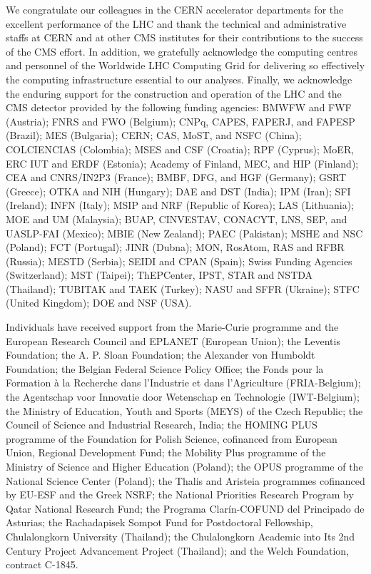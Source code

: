 \begin{acknowledgments}
We congratulate our colleagues in the CERN accelerator departments for the excellent performance of the LHC and thank the technical and administrative staffs at CERN and at other CMS institutes for their contributions to the success of the CMS effort. In addition, we gratefully acknowledge the computing centres and personnel of the Worldwide LHC Computing Grid for delivering so effectively the computing infrastructure essential to our analyses. Finally, we acknowledge the enduring support for the construction and operation of the LHC and the CMS detector provided by the following funding agencies: BMWFW and FWF (Austria); FNRS and FWO (Belgium); CNPq, CAPES, FAPERJ, and FAPESP (Brazil); MES (Bulgaria); CERN; CAS, MoST, and NSFC (China); COLCIENCIAS (Colombia); MSES and CSF (Croatia); RPF (Cyprus); MoER, ERC IUT and ERDF (Estonia); Academy of Finland, MEC, and HIP (Finland); CEA and CNRS/IN2P3 (France); BMBF, DFG, and HGF (Germany); GSRT (Greece); OTKA and NIH (Hungary); DAE and DST (India); IPM (Iran); SFI (Ireland); INFN (Italy); MSIP and NRF (Republic of Korea); LAS (Lithuania); MOE and UM (Malaysia); BUAP, CINVESTAV, CONACYT, LNS, SEP, and UASLP-FAI (Mexico); MBIE (New Zealand); PAEC (Pakistan); MSHE and NSC (Poland); FCT (Portugal); JINR (Dubna); MON, RosAtom, RAS and RFBR (Russia); MESTD (Serbia); SEIDI and CPAN (Spain); Swiss Funding Agencies (Switzerland); MST (Taipei); ThEPCenter, IPST, STAR and NSTDA (Thailand); TUBITAK and TAEK (Turkey); NASU and SFFR (Ukraine); STFC (United Kingdom); DOE and NSF (USA).

Individuals have received support from the Marie-Curie programme and the European Research Council and EPLANET (European Union); the Leventis Foundation; the A. P. Sloan Foundation; the Alexander von Humboldt Foundation; the Belgian Federal Science Policy Office; the Fonds pour la Formation \`a la Recherche dans l'Industrie et dans l'Agriculture (FRIA-Belgium); the Agentschap voor Innovatie door Wetenschap en Technologie (IWT-Belgium); the Ministry of Education, Youth and Sports (MEYS) of the Czech Republic; the Council of Science and Industrial Research, India; the HOMING PLUS programme of the Foundation for Polish Science, cofinanced from European Union, Regional Development Fund; the Mobility Plus programme of the Ministry of Science and Higher Education (Poland); the OPUS programme of the National Science Center (Poland); the Thalis and Aristeia programmes cofinanced by EU-ESF and the Greek NSRF; the National Priorities Research Program by Qatar National Research Fund; the Programa Clar\'in-COFUND del Principado de Asturias; the Rachadapisek Sompot Fund for Postdoctoral Fellowship, Chulalongkorn University (Thailand); the Chulalongkorn Academic into Its 2nd Century Project Advancement Project (Thailand); and the Welch Foundation, contract C-1845.
\end{acknowledgments}



